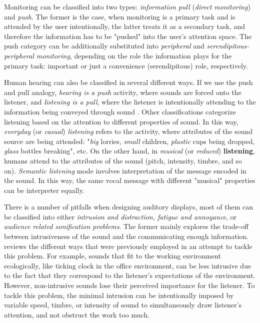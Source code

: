 Monitoring can be classified into two types: \textit{information pull} (\textit{direct monitoring}) and \textit{push}. The former is the case, when monitoring is a primary task and is attended by the user intentionally, the latter treats it as a secondary task, and therefore the information has to be "pushed" into the user's attention space. The push category can be additionally substituted into \textit{peripheral} and \textit{serendipitous-peripheral monitoring}, depending on the role the information plays for the primary task: important or just a convenience (serendipitous) role, respectively.

Human hearing can also be classified in several different ways. If we use the push and pull analogy, \textit{hearing is a push} activity, where sounds are forced onto the listener, and \textit{listening is a pull}, where the listener is intentionally attending to the information being conveyed through sound \parencite{hermann_sonification_2011}. Other classifications categorize listening based on the attention to different properties of sound. In this way, \textit{everyday} (or \textit{casual}) \textit{listening} refers to the activity, where attributes of the sound source are being attended: "\textit{big} lorries, \textit{small }children, \textit{plastic }cups being dropped, \textit{glass }bottles breaking", etc. On the other hand, in \textit{musical} (or \textit{reduced}) \textbf{listening}, humans attend to the attributes of the sound (pitch, intensity, timbre, and so on). \textit{Semantic listening} mode involves interpretation of the message encoded in the sound. In this way, the same vocal message with different "musical" properties can be interpreter equally.


There is a number of pitfalls when designing auditory displays, most of them can be classified into either \textit{intrusion and distraction, fatigue and annoyance}, or \textit{audience related sonification problems}.
The former mainly explores the trade-off between intrusiveness of the sound and the communicating enough information. \parencite{hermann_sonification_2011} reviews the different ways that were previously employed in an attempt to tackle this problem. For example, sounds that fit to the working environment ecologically, like ticking clock in the office environment, can be less intrusive due to the fact that they correspond to the listener's expectations of the environment. However, non-intrusive sounds lose their perceived importance for the listener. To tackle this problem, the minimal intrusion can be intentionally imposed by variable speed, timbre, or intensity of sound to simultaneously draw listener's attention, and not obstruct the work too much.


